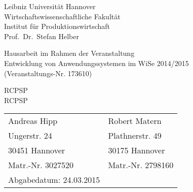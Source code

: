 \documentclass[a4paper,12pt,parskip,bibtotoc,liststotoc]{article}
\begin{document}
%
%
\thispagestyle{empty}  %
Leibniz Universität Hannover\\
Wirtschaftswissenschaftliche Fakultät\\
Institut für Produktionswirtschaft\\
Prof.\ Dr.\ Stefan Helber

\vspace{5cm}

\begin{center}
Hausarbeit im Rahmen der Veranstaltung \\
Entwicklung von Anwendungssystemen  im WiSe 2014/2015 \\
(Veranstaltungs-Nr. 173610)

\vspace{2.5cm}

{\Large RCPSP \\
RCPSP}
\end{center}

\vspace{5.5cm}


\begin{table}[h!]
    \vspace*{-3mm}
    \hspace*{2mm}
  \renewcommand{\arraystretch}{1,5}
    \begin{tabular}{ll}
Andreas Hipp &Robert Matern \\
Ungerstr. 24&Plathnerstr. 49 \\
30451 Hannover&30175 Hannover \\
Matr.-Nr. 3027520 &Matr.-Nr. 2798160 \\[3mm]
Abgabedatum: 24.03.2015
	\end{tabular}
\end{table}

\newpage

\tableofcontents

\newpage  %

\listoffigures

\listoftables

\renewcommand\lstlistlistingname{Quellcodeverzeichnis} 
\lstlistoflistings 
\renewcommand*\lstlistingname{Quellcode} 
\end{document}
